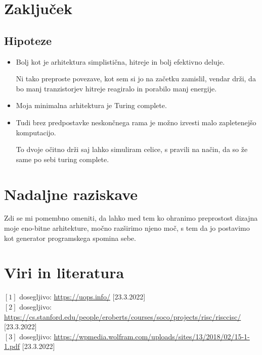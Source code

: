 \documentclass[12pt]{article}
\begin{document}
\section{Zaključek}
\subsection{Hipoteze}
\begin{itemize}
  \item Bolj kot je arhitektura simplistična, hitreje in bolj efektivno deluje.

        Ni tako preproste povezave, kot sem si jo na začetku zamislil, vendar drži, da bo manj tranzistorjev hitreje reagiralo in porabilo manj energije.

  \item Moja minimalna arhitektura je Turing complete.
  \item Tudi brez predpostavke neskončnega rama je možno izvesti malo zapletenejšo komputacijo.

        To dvoje očitno drži saj lahko simuliram celice, s pravili na način, da so že same po sebi turing complete.
\end{itemize}

\section{Nadaljne raziskave}
Zdi se mi pomembno omeniti, da lahko med tem ko ohranimo preprostost dizajna moje eno-bitne arhitekture, močno razširimo njeno moč, s tem da jo postavimo kot generator programskega spomina sebe.

\pagebreak
\section{Viri in literatura}
$[1]$ dosegljivo: \url{https://uops.info/} [23.3.2022]\\
$[2]$ dosegljivo: \url{https://cs.stanford.edu/people/eroberts/courses/soco/projects/risc/risccisc/} [23.3.2022]\\
$[3]$ dosegljivo: \url{https://wpmedia.wolfram.com/uploads/sites/13/2018/02/15-1-1.pdf} [23.3.2022]\\

\end{document}
